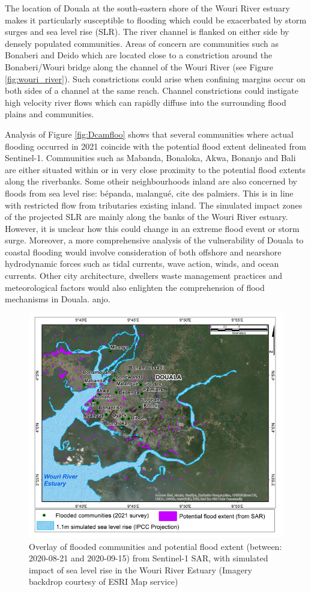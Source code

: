 The location of Douala at the south-eastern shore of the Wouri River estuary makes it particularly susceptible to flooding which could be exacerbated by storm surges and sea level rise (SLR). The river channel is flanked on either side by densely populated communities. Areas of concern are communities such as Bonaberi and Deido which are located close to a constriction around the Bonaberi/Wouri bridge along the channel of the Wouri River (see Figure \ref{fig:wouri_river}). Such constrictions could arise when confining margins occur on both sides of a channel at the same reach\cite{EnvironmentAgency2021}. Channel constrictions could instigate high velocity river flows which can rapidly diffuse into the surrounding flood plains and communities. 

Analysis of Figure \ref{fig:Dcamfloo} shows that several communities where actual flooding occurred in 2021 coincide with the potential flood extent delineated from Sentinel-1. Communities such as Mabanda, Bonaloka, Akwa, Bonanjo and Bali are either situated within or in very close proximity to the potential flood extents along the riverbanks. Some otheir neighbourhoods inland are also concerned by floods from sea level rise: bépanda, malangué, cite des palmiers. This is in line with restricted flow from tributaries existing inland. The simulated impact zones of the projected SLR are mainly along the banks of the Wouri River estuary. However, it is unclear how this could change in an extreme flood event or storm surge. Moreover, a more comprehensive analysis of the vulnerability of Douala to coastal flooding would involve consideration of both offshore and nearshore hydrodynamic forces such as tidal currents, wave action, winds, and ocean currents.  Other city architecture, dwellers waste management practices and meteorological factors would also enlighten the comprehension of flood mechanisms in Douala.
anjo.

\begin{figure} %
	\centering
	\includegraphics[width=0.45\linewidth]{figure/Douala_ops_1_IPCC_SAR_layB}
	\caption{Overlay of flooded communities and potential flood extent (between: 2020-08-21 and 2020-09-15) from Sentinel-1 SAR, with simulated impact of sea level rise in the Wouri River Estuary (Imagery backdrop courtesy of ESRI Map service)}
	\label{fig:Douala_ops_1_IPCC_SAR_layB}
\end{figure}

